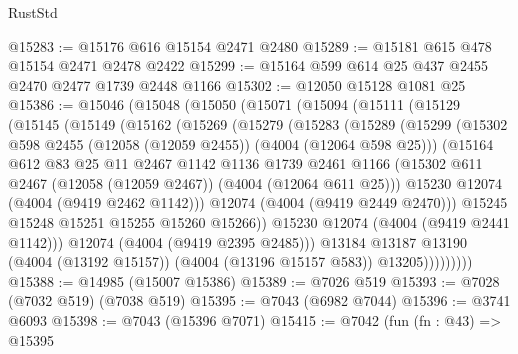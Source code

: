 \begin{lexlean}{RustStd}
\begin{coremodule}
@15283 := @15176 @616 @15154 @2471 @2480
@15289 := @15181 @615 @478 @15154 @2471 @2478 @2422
@15299 := @15164 @599 @614 @25 @437 @2455 @2470 @2477 @1739 @2448 @1166
@15302 := @12050 @15128 @1081 @25
@15386 := @15046
    (@15048
      (@15050
        (@15071
          (@15094
            (@15111
              (@15129
                (@15145
                  (@15149
                    (@15162
                      (@15269
                        (@15279
                          (@15283
                            (@15289
                              (@15299
                                (@15302
                                  @598
                                  @2455
                                  (@12058 (@12059 @2455))
                                  (@4004 (@12064 @598 @25)))
                                (@15164
                                  @612
                                  @83
                                  @25
                                  @11
                                  @2467
                                  @1142
                                  @1136
                                  @1739
                                  @2461
                                  @1166
                                  (@15302
                                    @611
                                    @2467
                                    (@12058 (@12059 @2467))
                                    (@4004 (@12064 @611 @25)))
                                  @15230
                                  @12074
                                  (@4004 (@9419 @2462 @1142)))
                                @12074
                                (@4004 (@9419 @2449 @2470)))
                              @15245
                              @15248
                              @15251
                              @15255
                              @15260
                              @15266))
                          @15230
                          @12074
                          (@4004 (@9419 @2441 @1142)))
                        @12074
                        (@4004 (@9419 @2395 @2485)))
                      @13184
                      @13187
                      @13190
                      (@4004 (@13192 @15157))
                      (@4004 (@13196 @15157 @583))
                      @13205)))))))))
@15388 := @14985 (@15007 @15386)
@15389 := @7026 @519
@15393 := @7028 (@7032 @519) (@7038 @519)
@15395 := @7043 (@6982 @7044)
@15396 := @3741 @6093
@15398 := @7043 (@15396 @7071)
@15415 := @7042
    (fun (fn : @43) =>
    @15395

\end{coremodule}
\end{lexlean}
